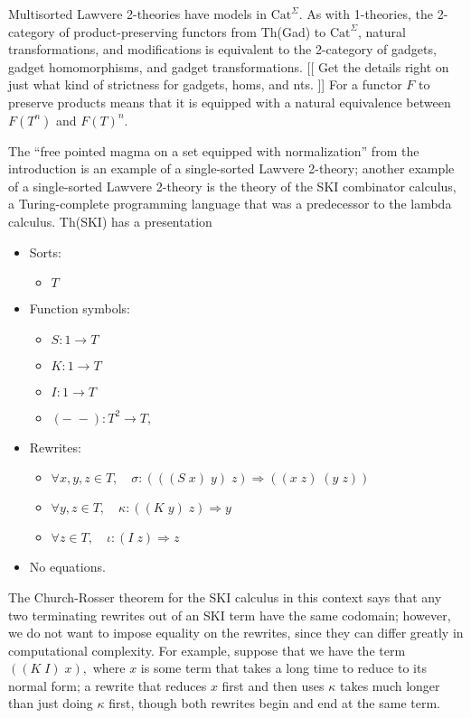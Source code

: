 \documentclass{article}
\newcommand{\maps}{\colon}
\newcommand{\Cat}{\mathrm{Cat}}
\begin{document}
Multisorted Lawvere 2-theories have models in $\Cat^\Sigma.$  As with 1-theories, the 2-category of product-preserving functors from Th(Gad) to $\Cat^\Sigma$, natural transformations, and modifications is equivalent to the 2-category of gadgets, gadget homomorphisms, and gadget transformations.  [[ Get the details right on just what kind of strictness for gadgets, homs, and nts. ]] For a functor $F$ to preserve products means that it is equipped with a natural equivalence between $F(T^n)$ and $F(T)^n.$

The ``free pointed magma on a set equipped with normalization'' from the introduction is an example of a single-sorted Lawvere 2-theory; another example of a single-sorted Lawvere 2-theory is the theory of the SKI combinator calculus, a Turing-complete programming language that was a predecessor to the lambda calculus.  Th(SKI) has a presentation
\begin{center}
  \begin{itemize}
    \item Sorts:
    \begin{itemize}
      \item $T$
    \end{itemize}
    \item Function symbols:
    \begin{itemize}
      \item $S\maps 1 \to T$
      \item $K\maps 1 \to T$
      \item $I\maps 1 \to T$
      \item $(-\;-)\maps T^2 \to T,$
    \end{itemize}
    \item Rewrites:
    \begin{itemize}
      \item $\forall x,y,z \in T, \quad \sigma \maps (((S\; x)\; y)\; z) \Rightarrow ((x\; z)\; (y\; z))$
      \item $\forall y,z \in T, \quad \kappa \maps ((K\; y)\; z) \Rightarrow y$
      \item $\forall z \in T, \quad \iota \maps (I\; z) \Rightarrow z$
    \end{itemize}
    \item No equations.
  \end{itemize}
\end{center}
The Church-Rosser theorem for the SKI calculus in this context says that any two terminating rewrites out of an SKI term have the same codomain; however, we do not want to impose equality on the rewrites, since they can differ greatly in computational complexity.  For example, suppose that we have the term $((K\; I)\; x),$ where $x$ is some term that takes a long time to reduce to its normal form; a rewrite that reduces $x$ first and then uses $\kappa$ takes much longer than just doing $\kappa$ first, though both rewrites begin and end at the same term.
\end{document}
